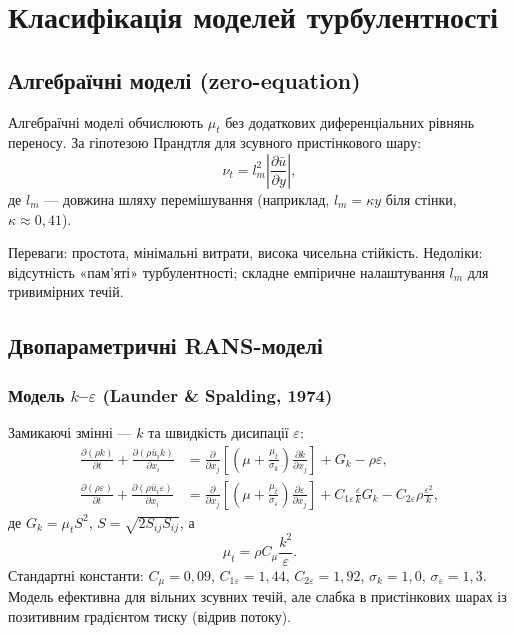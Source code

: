 \documentclass[14pt,a4paper,extarticle]{extarticle}
\begin{document}
\section{Класифікація моделей турбулентності}

\subsection{Алгебраїчні моделі (zero-equation)}

Алгебраїчні моделі обчислюють $\mu_t$ без додаткових диференціальних
рівнянь переносу. За гіпотезою Прандтля для зсувного пристінкового шару:
\begin{equation}
  \nu_t = l_m^2 \left| \frac{\partial \bar{u}}{\partial y} \right|,
  \label{eq:prandtl}
\end{equation}
де $l_m$ --- довжина шляху перемішування (наприклад, $l_m = \kappa y$ біля
стінки, $\kappa \approx 0{,}41$).

Переваги: простота, мінімальні витрати, висока чисельна стійкість.
Недоліки: відсутність «пам'яті» турбулентності; складне емпіричне
налаштування $l_m$ для тривимірних течій.

\subsection{Двопараметричні RANS-моделі}

\subsubsection{Модель $k$--$\varepsilon$ (Launder \& Spalding, 1974)}

Замикаючі змінні --- $k$ та швидкість дисипації $\varepsilon$:
\begin{align}
  \frac{\partial (\rho k)}{\partial t} + \frac{\partial (\rho \bar{u}_i k)}{\partial x_i}
  &= \frac{\partial}{\partial x_j} \left[ \left( \mu + \frac{\mu_t}{\sigma_k} \right) \frac{\partial k}{\partial x_j} \right]
    + G_k - \rho \varepsilon, \label{eq:k-eps-k}\\
  \frac{\partial (\rho \varepsilon)}{\partial t} + \frac{\partial (\rho \bar{u}_i \varepsilon)}{\partial x_i}
  &= \frac{\partial}{\partial x_j} \left[ \left( \mu + \frac{\mu_t}{\sigma_\varepsilon} \right) \frac{\partial \varepsilon}{\partial x_j} \right]
    + C_{1\varepsilon} \frac{\varepsilon}{k} G_k - C_{2\varepsilon} \rho \frac{\varepsilon^2}{k}, \label{eq:k-eps-eps}
\end{align}
де $G_k = \mu_t S^2$, $S = \sqrt{2 S_{ij} S_{ij}}$, а
\begin{equation}
  \mu_t = \rho C_\mu \frac{k^2}{\varepsilon}.
  \label{eq:mut-keps}
\end{equation}
Стандартні константи: $C_\mu = 0{,}09$, $C_{1\varepsilon} = 1{,}44$,
$C_{2\varepsilon} = 1{,}92$, $\sigma_k = 1{,}0$, $\sigma_\varepsilon = 1{,}3$.
Модель ефективна для вільних зсувних течій, але слабка в пристінкових
шарах із позитивним градієнтом тиску (відрив потоку).
\end{document}
